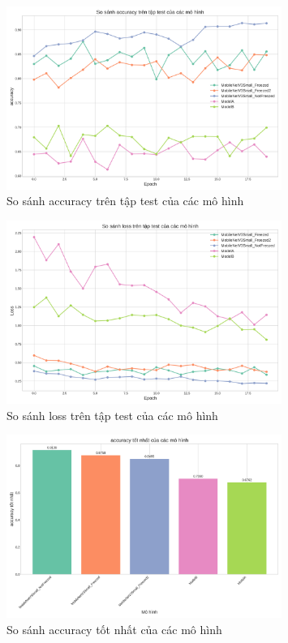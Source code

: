 \begin{figure}[h]
  \centering
  \includegraphics[width=0.8\textwidth]{analysis_results/test_accuracy_comparison.png}
  \caption{So sánh accuracy trên tập test của các mô hình}
  \label{fig:test_accuracy}
\end{figure}

\begin{figure}[h]
  \centering
  \includegraphics[width=0.8\textwidth]{analysis_results/test_loss_comparison.png}
  \caption{So sánh loss trên tập test của các mô hình}
  \label{fig:test_loss}
\end{figure}

\begin{figure}[h]
  \centering
  \includegraphics[width=0.8\textwidth]{analysis_results/best_accuracy_comparison.png}
  \caption{So sánh accuracy tốt nhất của các mô hình}
  \label{fig:best_accuracy}
\end{figure}
